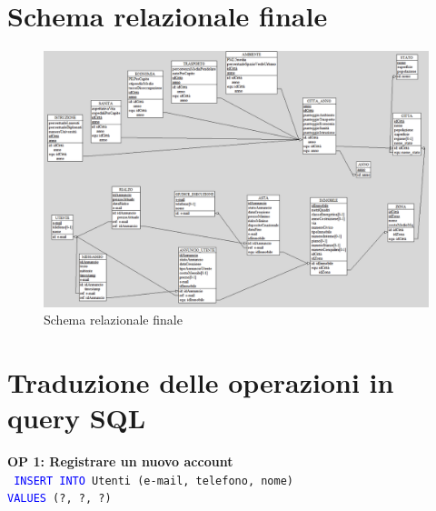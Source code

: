 \documentclass[a4paper,12pt]{report}
\begin{document}
            \section{Schema relazionale finale}
                \begin{figure}[H]
                    \centering{}
                    \includegraphics[width=\linewidth]{./images/relational_scheme.png}
                    \caption{Schema relazionale finale}
            \end{figure}
                
            \section{Traduzione delle operazioni in query SQL}

            \textbf{OP 1: Registrare un nuovo account} \\
            \texttt{
                \textcolor{blue}{INSERT INTO} Utenti (e-mail, telefono, nome) \\
                \textcolor{blue}{VALUES} (?, ?, ?) \\
            } 
            
\end{document}
